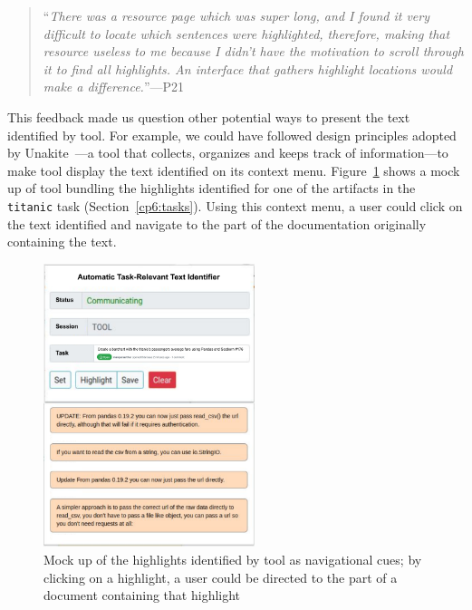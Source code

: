 \smallskip
\begin{quote}
``\textit{There was a resource page which was super long, and I found it very difficult to locate which sentences were highlighted, therefore, making that resource useless to me because I didn't have the motivation to scroll through it to find all highlights. An interface that gathers highlight locations would make a difference.}''---P21
\end{quote}


\smallskip
This feedback made us question other potential ways to present the text identified by \acs{tool}.
For example, we could have followed design principles adopted by Unakite~\cite{Liu2018Unakite}---a tool that collects, organizes and keeps track of information---to make \acs{tool} display the text identified on its context menu.
Figure~\ref{fig:navigational-cues} shows a mock up of \acs{tool} bundling the highlights identified for one of the artifacts in the \texttt{titanic} task (Section~\ref{cp6:tasks}).
Using this context menu, a user could click on the text identified and navigate to the part of the documentation 
originally containing the text.



\begin{figure}[H]
    \centering
    \includegraphics[width=0.55\textwidth]{fig/cp7/navigational-cues}
    \caption{Mock up of the highlights identified by \acs{tool} as navigational cues; by clicking on a highlight, a user could be directed to the part of a document containing that highlight}
    \label{fig:navigational-cues}
\end{figure}



